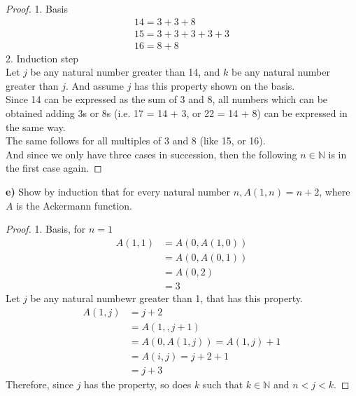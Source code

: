 \documentclass[titlepage, letterpaper, fleqn]{article}
\newcommand{\spacepls}{\vspace{5mm}}
\begin{document}
\begin{proof}
1. Basis\\
\begin{align*}
14 = 3 + 3 + 8\\
15 = 3 + 3 + 3 + 3 + 3\\
16 = 8 + 8
\end{align*}
2. Induction step\\
Let \(j\) be any natural number greater than 14, and \(k\) be any natural number greater than \(j\). And assume \(j\) has this property shown on the basis.\\
Since 14 can be expressed as the sum of 3 and 8, all numbers which can be obtained adding 3s or 8s (i.e. 17 = 14 + 3, or 22 = 14 + 8) can be expressed in the same way.\\
The same follows for all multiples of 3 and 8 (like  15, or 16).\\
And since we only have three cases in succession, then the following \(n \in \mathbb{N}\) is in the first case again.
\end{proof}

\spacepls

{\large \textbf{e)} Show by induction that for every natural number \(n, A(1,n) = n+2\), where \(A\) is the Ackermann function.}

\begin{proof}
1. Basis, for \(n = 1\)
\begin{align*}
    A(1,1) & = A(0,A(1,0))\\
    & = A(0, A(0,1))\\
	& = A(0,2)\\
	& = 3
\end{align*}
Let \(j\) be any natural numbewr greater than 1, that has this property.\\
\begin{align*}
A(1,j) & = j + 2\\
& = A(1,,j+1) \tag*{by induction}\\
& = A(0, A(1,j)) = A(1,j) + 1 \tag*{by definition}\\
& = A(i, j)  = j + 2 + 1\\
& = j + 3
\end{align*}
Therefore, since \(j\) has the property, so does \(k\) such that \(k \in \mathbb{N}\) and \(n < j < k\).
\end{proof}
\end{document}
